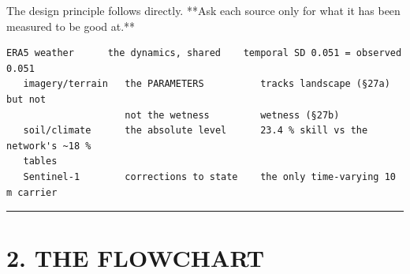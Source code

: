 \documentclass[10pt,a4paper]{article}
\begin{document}
The design principle follows directly. **Ask each source only for what it has
been measured to be good at.**

\begin{Verbatim}[fontsize=\scriptsize,frame=leftline,framerule=0.6pt,rulecolor=\color{rulegray},xleftmargin=6pt,framesep=6pt,]
   ERA5 weather      the dynamics, shared    temporal SD 0.051 = observed 0.051
   imagery/terrain   the PARAMETERS          tracks landscape (§27a) but not
                     not the wetness         wetness (§27b)
   soil/climate      the absolute level      23.4 % skill vs the network's ~18 %
   tables
   Sentinel-1        corrections to state    the only time-varying 10 m carrier
\end{Verbatim}

\medskip\hrule\medskip

\section*{2. THE FLOWCHART}
\end{document}
